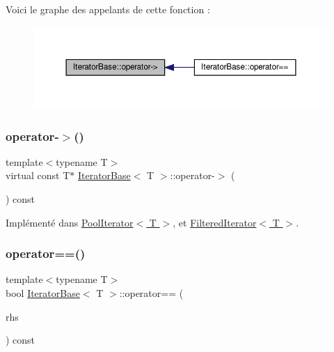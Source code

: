 Voici le graphe des appelants de cette fonction \+:\nopagebreak
\begin{figure}[H]
\begin{center}
\leavevmode
\includegraphics[width=350pt]{class_iterator_base_aad2254f7877e4647f699ceb455e893ff_icgraph}
\end{center}
\end{figure}
\mbox{\label{class_iterator_base_a49d96fd63062ca0d7fd813517ad69f03}} 
\subsubsection{\texorpdfstring{operator-\/$>$()}{operator->()}\hspace{0.1cm}{\footnotesize\ttfamily [2/2]}}
{\footnotesize\ttfamily template$<$typename T$>$ \\
virtual const T$\ast$ \hyperlink{class_iterator_base}{Iterator\+Base}$<$ T $>$\+::operator-\/$>$ (\begin{DoxyParamCaption}{ }\end{DoxyParamCaption}) const\hspace{0.3cm}{\ttfamily [pure virtual]}}



Implémenté dans \hyperlink{class_pool_iterator_a228d6ee24cd015a7312fa9f76244994c}{Pool\+Iterator$<$ T $>$}, et \hyperlink{class_filtered_iterator_a75ea4ec86c45f496c1515e8e9832cd0f}{Filtered\+Iterator$<$ T $>$}.

\mbox{\label{class_iterator_base_a7475728422cb73f91d1c4cb4c3d07499}} 
\subsubsection{\texorpdfstring{operator==()}{operator==()}}
{\footnotesize\ttfamily template$<$typename T$>$ \\
bool \hyperlink{class_iterator_base}{Iterator\+Base}$<$ T $>$\+::operator== (\begin{DoxyParamCaption}\item[{const \hyperlink{class_iterator_base}{Iterator\+Base}$<$ T $>$ \&}]{rhs }\end{DoxyParamCaption}) const\hspace{0.3cm}{\ttfamily [inline]}}



